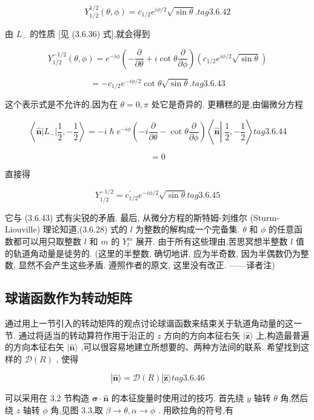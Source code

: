 $$
{Y}_{1/2}^{1/2}\left( {\theta ,\phi }\right) = {c}_{1/2}{e}^{{i\phi }/2}\sqrt{\sin \theta }. tag{3. 6.42}
$$

由 ${L}_{ - }$ 的性质 [见 (3.6.36) 式],就会得到

$$
{Y}_{1/2}^{-1/2}\left( {\theta ,\phi }\right) = {e}^{-{i\phi }}\left( {-\frac{\partial }{\partial \theta } + i\cot \theta \frac{\partial }{\partial \phi }}\right) \left( {{c}_{1/2}{e}^{{i\phi }/2}\sqrt{\sin \theta }}\right)
$$

$$
= - {c}_{1/2}{e}^{-{i\phi }/2}\cot \theta \sqrt{\sin \theta }\text{.} tag{3. 6.43}
$$

这个表示式是不允许的,因为在 $\theta = 0,\pi$ 处它是奇异的. 更糟糕的是,由偏微分方程

$$
\left\langle {\widehat{\mathbf{n}}\left| {L}_{ - }\right| \frac{1}{2}, - \frac{1}{2}}\right\rangle = - i\hslash {e}^{-{i\phi }}\left( {-i\frac{\partial }{\partial \theta } - \cot \theta \frac{\partial }{\partial \phi }}\right) \left\langle {\widehat{\mathbf{n}}\left| {\;\frac{1}{2}}\right. , - \frac{1}{2}}\right\rangle tag{3. 6.44}
$$

$$
= 0
$$

直接得

$$
{Y}_{1/2}^{-1/2} = {c}_{1/2}^{\prime }{e}^{-{i\phi }/2}\sqrt{\sin \theta } tag{3. 6.45}
$$

它与 (3.6.43) 式有尖锐的矛盾. 最后, 从微分方程的斯特姆-刘维尔 (Sturm-Liouville) 理论知道,(3.6.28) 式的 $l$ 为整数的解构成一个完备集. $\theta$ 和 $\phi$ 的任意函数都可以用只取整数 $l$ 和 $m$ 的 ${Y}_{l}^{m}$ 展开. 由于所有这些理由,苦思冥想半整数 $l$ 值的轨道角动量是徒劳的. (这里的半整数, 确切地讲, 应为半奇数, 因为半偶数仍为整数, 显然不会产生这些矛盾. 遵照作者的原文, 这里没有改正. ——译者注)

\subsection{球谐函数作为转动矩阵}

通过用上一节引入的转动矩阵的观点讨论球谐函数来结束关于轨道角动量的这一节. 通过将适当的转动算符作用于沿正的 $z$ 方向的方向本征右矢 $|\widehat{\mathbf{z}}\rangle$ 上,构造最普遍的方向本征右矢 $|\widehat{\mathbf{n}}\rangle$ ,可以很容易地建立所想要的、两种方法间的联系. 希望找到这样的 $\mathcal{D}\left( R\right)$ , 使得

$$
\left| {\widehat{\mathbf{n}}\rangle = \mathcal{D}\left( R\right) }\right| \widehat{\mathbf{z}}\rangle tag{3. 6.46}
$$

可以采用在 3.2 节构造 $\mathbf{\sigma } \cdot \widehat{\mathbf{n}}$ 的本征旋量时使用过的技巧. 首先绕 $y$ 轴转 $\theta$ 角,然后绕 $z$ 轴转 $\phi$ 角,见图 3.3,取 $\beta \rightarrow \theta ,\alpha \rightarrow \phi$ . 用欧拉角的符号,有

